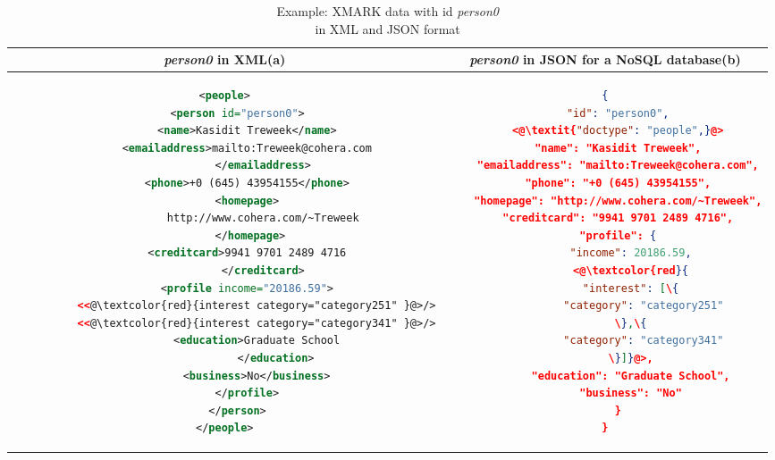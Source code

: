 \begin{longtable}{c|c}
	\caption{Example: XMARK data with id \textit{person0} \\in XML and JSON format }
	\label{tbl:xmark-xml-json}\\
	{\textit{person0}} in XML(a) & {\textit{person0}} in JSON for a NoSQL database(b)\\
	\hline
	\begin{minipage}{.4\textwidth}
\centering		
\begin{lstlisting}[language=XML,basicstyle = \tiny,label=code:xml-nosql-person0]
<people>
    <person id="person0">
       <name>Kasidit Treweek</name>
       <emailaddress>mailto:Treweek@cohera.com
            </emailaddress>
       <phone>+0 (645) 43954155</phone>
       <homepage>
            http://www.cohera.com/~Treweek
        </homepage>
       <creditcard>9941 9701 2489 4716
            </creditcard>
       <profile income="20186.59">
          <<@\textcolor{red}{interest category="category251" }@>/>
          <<@\textcolor{red}{interest category="category341" }@>/>
          <education>Graduate School
                </education>
          <business>No</business>
       </profile>
    </person>
</people>
\end{lstlisting}	
	\end{minipage} &
	\begin{minipage}{.55\textwidth}
		\centering
		\begin{lstlisting}[language=JSON, basicstyle =\tiny, label=code:json-nosql-person0, numberstyle=\tiny]
{
	"id": "person0",
	<@\textit{"doctype": "people",}@>
	"name": "Kasidit Treweek",
	"emailaddress": "mailto:Treweek@cohera.com",
	"phone": "+0 (645) 43954155",
	"homepage": "http://www.cohera.com/~Treweek",
	"creditcard": "9941 9701 2489 4716",
	"profile": {
		"income": 20186.59,
		<@\textcolor{red}{
		"interest": [\{
			"category": "category251"
		\},\{
			"category": "category341"
		\}]}@>,
		"education": "Graduate School",
		"business": "No"
	}
}
		\end{lstlisting}
	\end{minipage}\\
\end{longtable}

\begin{comment}
\iffalse\fi
\begin{minipage}{.5\textwidth}
	\begin{tikzpicture}[%
	grow via three points={one child at (0.5,-0.7) and
		two children at (0.5,-0.7) and (0.5,-1.4)},
	edge from parent path={(\tikzparentnode.south) |- (\tikzchildnode.west)}]
	\node {\{asfdasfd\}}
	child { node [defi] {\textit{Schema\_ID}}}
	child { node [json] {xs:attribute}
		child { node [defi] {\textit{Attribute\_ID}}}
		child { node [attribute] {@name}}
		child { node [attribute] {@type}}
		child { node [attribute] {@fixed}}
		child { node [attribute] {@default}}
	};
	\end{tikzpicture}
\end{minipage}

\end{comment}

